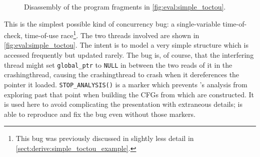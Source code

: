 \begin{figure}
  \hspace{-5mm}
  \caption{Disassembly of the program fragments in
    \autoref{fig:eval:simple_toctou}.}
  \label{fig:eval:simple_toctou:compiled}
\end{figure}

This is the simplest possible kind of concurrency bug: a
single-variable time-of-check, time-of-use race\footnote{This bug was
  previously discussed in slightly less detail in
  \autoref{sect:derive:simple_toctou_example}.}.  The two threads
involved are shown in \autoref{fig:eval:simple_toctou}.  The intent is
to model a very simple structure which is accessed frequently but
updated rarely.  The bug is, of course, that the interfering thread
might set \texttt{global\_ptr} to \texttt{NULL} in between the two
reads of it in the \gls{crashingthread}, causing the
\gls{crashingthread} to crash when it dereferences the pointer it
loaded.  \texttt{STOP\_ANALYSIS()} is a marker which prevents
{\technique}'s analysis from exploring past that point when building
the CFGs from which {\StateMachines} are constructed.  It is used here
to avoid complicating the presentation with extraneous details;
{\implementation} is able to reproduce and fix the bug even without
those markers.

